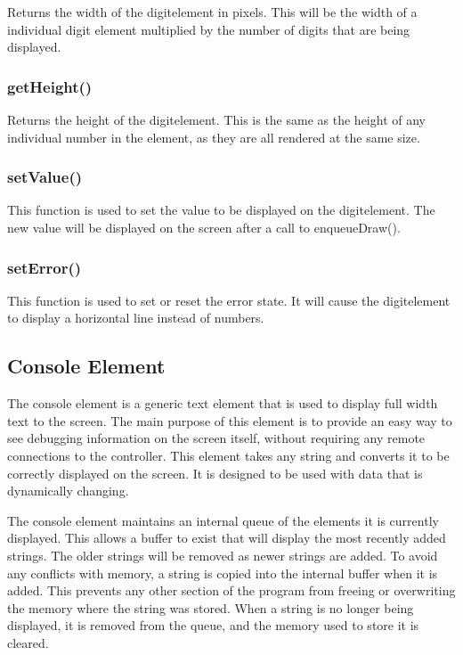 Returns the width of the digitelement in  pixels. This will be the width of a individual digit element multiplied by the number of digits that are being displayed.

\subsubsection{getHeight()}

Returns the height of the digitelement. This is the same as the height of any individual number in the element, as they are all rendered at the same size.

\subsubsection{setValue()}

This function is used to set the value to be displayed on the digitelement. The new value will be displayed on the screen after a call to enqueueDraw().

\subsubsection{setError()}

This function is used to set or reset the error state. It will cause the digitelement to display a horizontal line instead of numbers. 

\subsection{Console Element}
\label{sec:consoleelement}

The console element is a generic text element that is used to display full width text to the screen. The main purpose of this element is to provide an easy way to see debugging information on the screen itself, without requiring any remote connections to the controller. This element takes any string and converts it to be correctly displayed on the screen. It is designed to be used with data that is dynamically changing.

The console element maintains an internal queue of the elements it is currently displayed. This allows a buffer to exist that will display the most recently added strings. The older strings will be removed as newer strings are added. To avoid any conflicts with memory, a string is copied into the internal buffer when it is added. This prevents any other section of the program from freeing or overwriting the memory where the string was stored. When a string is no longer being displayed, it is removed from the queue, and the memory used to store it is cleared.

